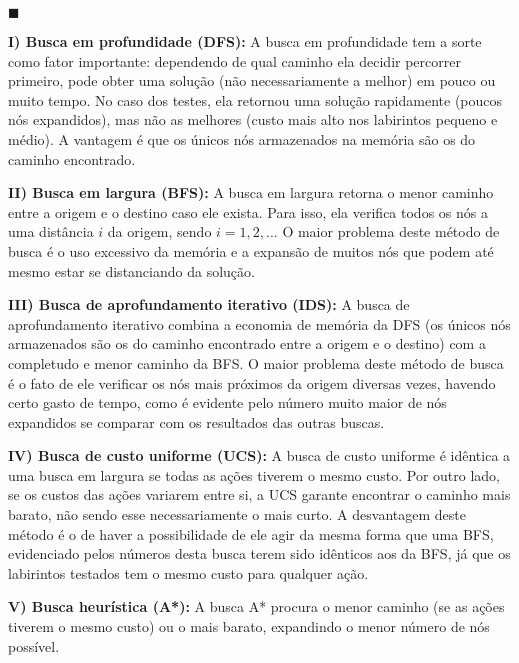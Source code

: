 \documentclass{article}
\begin{document}
\begin{flushright}
$\blacksquare$
\end{flushright}


\bigskip
{}

\bigskip
\qquad \textbf{I) Busca em profundidade (DFS):} A busca em profundidade tem a sorte como fator importante: dependendo de qual caminho ela decidir percorrer primeiro, pode obter uma solução (não necessariamente a melhor) em pouco ou muito tempo. No caso dos testes, ela retornou uma solução rapidamente (poucos nós expandidos), mas não as melhores (custo mais alto nos labirintos pequeno e médio). A vantagem é que os únicos nós armazenados na memória são os do caminho encontrado.

\bigskip
\qquad \textbf{II) Busca em largura (BFS):} A busca em largura retorna o menor caminho entre a origem e o destino caso ele exista. Para isso, ela verifica todos os nós a uma distância $i$ da origem, sendo $i = 1, 2, ...$ O maior problema deste método de busca é o uso excessivo da memória e a expansão de muitos nós que podem até mesmo estar se distanciando da solução.

\bigskip
\qquad \textbf{III) Busca de aprofundamento iterativo (IDS):} A busca de aprofundamento iterativo combina a economia de memória da DFS (os únicos nós armazenados são os do caminho encontrado entre a origem e o destino) com a completudo e menor caminho da BFS. O maior problema deste método de busca é o fato de ele verificar os nós mais próximos da origem diversas vezes, havendo certo gasto de tempo, como é evidente pelo número muito maior de nós expandidos se comparar com os resultados das outras buscas.

\bigskip
\qquad \textbf{IV) Busca de custo uniforme (UCS):} A busca de custo uniforme é idêntica a uma busca em largura se todas as ações tiverem o mesmo custo. Por outro lado, se os custos das ações variarem entre si, a UCS garante encontrar o caminho mais barato, não sendo esse necessariamente o mais curto. A desvantagem deste método é o de haver a possibilidade de ele agir da mesma forma que uma BFS, evidenciado pelos números desta busca terem sido idênticos aos da BFS, já que os labirintos testados tem o mesmo custo para qualquer ação.

\bigskip
\qquad \textbf{V) Busca heurística (A*):} A busca A* procura o menor caminho (se as ações tiverem o mesmo custo) ou o mais barato, expandindo o menor número de nós possível.
\end{document}
